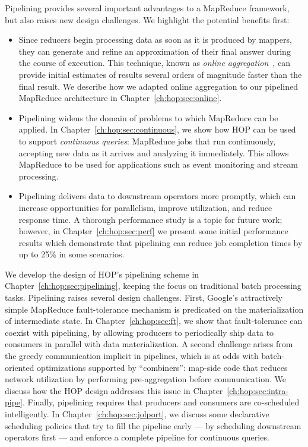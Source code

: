 Pipelining provides several important advantages to a MapReduce
framework, but also raises new design challenges. We highlight the
potential benefits first:
\begin{itemize}
\ssp
\item
  Since reducers begin processing data as soon as it is produced by mappers,
  they can generate and refine an approximation of their final answer during the
  course of execution. This technique, known as {\em online
    aggregation}~\cite{onlineagg}, can provide initial estimates of results
  several orders of magnitude faster than the final result.  We
  describe how we adapted online aggregation to our pipelined MapReduce
  architecture in Chapter~\ref{ch:hop:sec:online}.

\item
  Pipelining widens the domain of problems to which MapReduce can be applied. In
  Chapter~\ref{ch:hop:sec:continuous}, we show how HOP can be used to support
  {\em continuous queries}: MapReduce jobs that run continuously, accepting new
  data as it arrives and analyzing it immediately. This allows MapReduce to be
  used for applications such as event monitoring and stream processing.

\item
  Pipelining delivers data to downstream operators more promptly, which can
  increase opportunities for parallelism, improve utilization, and reduce
  response time. A thorough performance study is a topic for future work;
  however, in Chapter~\ref{ch:hop:sec:perf} we present some initial performance
  results which demonstrate that pipelining can reduce job completion times by
  up to 25\% in some scenarios.
\end{itemize}

We develop the design of HOP's pipelining scheme in
Chapter~\ref{ch:hop:sec:pipelining}, keeping the focus on traditional batch
processing tasks.  Pipelining raises several design challenges.  First,
Google's attractively simple MapReduce fault-tolerance mechanism is predicated
on the materialization of intermediate state.  In Chapter~\ref{ch:hop:sec:ft},
we show that fault-tolerance can coexist with pipelining, by allowing producers
to periodically ship data to consumers in parallel with data materialization.
A second challenge arises from the greedy communication implicit in pipelines,
which is at odds with batch-oriented optimizations supported by ``combiners'':
map-side code that reduces network utilization by performing pre-aggregation
before communication.  We discuss how the HOP design addresses this issue in
Chapter~\ref{ch:hop:sec:intra-pipe}.  Finally, pipelining requires that
producers and consumers are co-scheduled intelligently.  In
Chapter~\ref{ch:hop:sec:jolport}, we discuss some declarative scheduling
policies that try to fill the pipeline early --- by scheduling downstream
operators first --- and enforce a complete pipeline for continuous queries.

